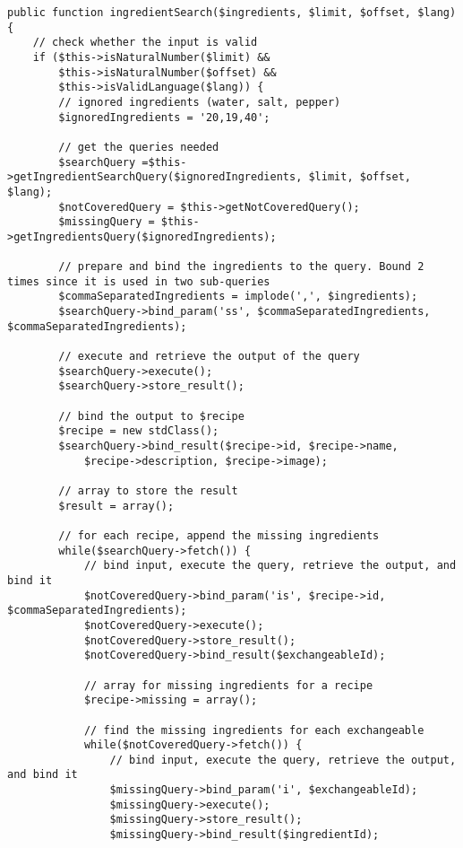 \begin{lstlisting}[language=phpstyle, caption={Search by ingredients.}]
public function ingredientSearch($ingredients, $limit, $offset, $lang) {
    // check whether the input is valid
    if ($this->isNaturalNumber($limit) &&
    	$this->isNaturalNumber($offset) &&
    	$this->isValidLanguage($lang)) {
        // ignored ingredients (water, salt, pepper)
        $ignoredIngredients = '20,19,40';

        // get the queries needed
        $searchQuery =$this->getIngredientSearchQuery($ignoredIngredients, $limit, $offset, $lang);
        $notCoveredQuery = $this->getNotCoveredQuery();
        $missingQuery = $this->getIngredientsQuery($ignoredIngredients);

        // prepare and bind the ingredients to the query. Bound 2 times since it is used in two sub-queries
        $commaSeparatedIngredients = implode(',', $ingredients);
        $searchQuery->bind_param('ss', $commaSeparatedIngredients, $commaSeparatedIngredients);
        
        // execute and retrieve the output of the query
        $searchQuery->execute();
        $searchQuery->store_result();

        // bind the output to $recipe
        $recipe = new stdClass();
        $searchQuery->bind_result($recipe->id, $recipe->name,
            $recipe->description, $recipe->image);

        // array to store the result
        $result = array();

        // for each recipe, append the missing ingredients 
        while($searchQuery->fetch()) {
        	// bind input, execute the query, retrieve the output, and bind it
            $notCoveredQuery->bind_param('is', $recipe->id, $commaSeparatedIngredients);
            $notCoveredQuery->execute();
            $notCoveredQuery->store_result();
            $notCoveredQuery->bind_result($exchangeableId);

            // array for missing ingredients for a recipe
        	$recipe->missing = array();

        	// find the missing ingredients for each exchangeable
        	while($notCoveredQuery->fetch()) {
                // bind input, execute the query, retrieve the output, and bind it
                $missingQuery->bind_param('i', $exchangeableId);
                $missingQuery->execute();
                $missingQuery->store_result();
                $missingQuery->bind_result($ingredientId);


\end{lstlisting}
